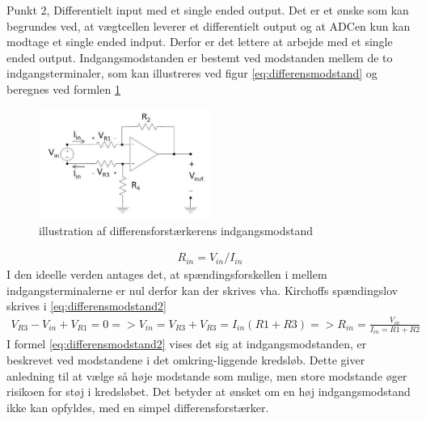 Punkt 2, Differentielt input med et single ended output. Det er et ønske som kan begrundes ved, at vægtcellen leverer et differentielt output og at ADCen kun kan modtage et single ended indput. Derfor er det lettere at arbejde med et single ended output. Indgangsmodstanden er bestemt ved modstanden mellem de to indgangsterminaler, som kan illustreres ved figur \ref{eq:differensmodstand} og beregnes ved formlen \ref{fig:differensmodstand}
\begin{figure}[H]
	\centering
	\includegraphics[width=0.5\textwidth]{billeder/Hardware/differensmodstand.JPG}
	\caption{illustration af differensforstærkerens indgangsmodstand}
	\label{fig:differensmodstand}
\end{figure}
\begin{align}
 R_{in} =V_{in}/I_{in}
 \label{eq:differensmodstand}
 \end{align}
I den ideelle verden antages det, at spændingsforskellen i mellem indgangsterminalerne er nul derfor kan der skrives vha. Kirchoffs spændingslov skrives i \ref{eq:differensmodstand2}
\begin{align}
 V_{R3}-V_{in}+V_{R1}=0=>V_{in}=V_{R3}+V_{R3}=I_{in}(R1+R3)=>R_{in}=\frac{V_{in}}{I_{in}=R1+R2}
 \label{eq:differensmodstand2}
 \end{align}
 I formel \ref{eq:differensmodstand2} vises det sig at indgangsmodstanden, er beskrevet ved modstandene i det omkring-liggende kredsløb. Dette giver anledning til at vælge så høje modstande som mulige, men store modstande øger risikoen for støj i kredsløbet. Det betyder at ønsket om en høj indgangsmodstand ikke kan opfyldes, med en simpel differensforstærker.



